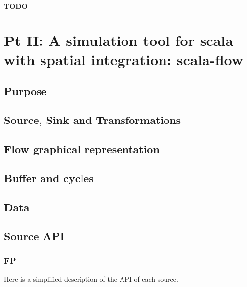 \documentclass[12pt,]{article}
\begin{document}
\textbf{TODO}

\section{Pt II: A simulation tool for scala with spatial integration:
scala-flow}\label{pt-ii-a-simulation-tool-for-scala-with-spatial-integration-scala-flow}

\subsection{Purpose}\label{purpose}

\subsection{Source, Sink and
Transformations}\label{source-sink-and-transformations}

\subsection{Flow graphical
representation}\label{flow-graphical-representation}

\subsection{Buffer and cycles}\label{buffer-and-cycles}

\subsection{Data}\label{data}

\subsection{Source API}\label{source-api}

\subsubsection{FP}\label{fp}

Here is a simplified description of the API of each source.
\end{document}
